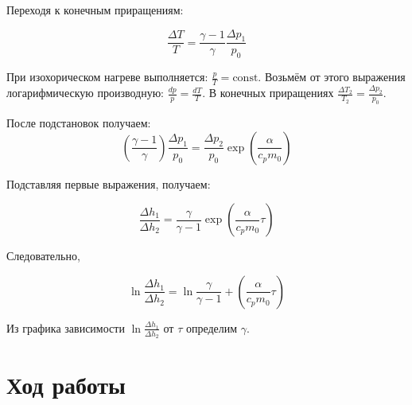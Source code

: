 \documentclass[a4paper,12pt]{article}
\begin{document}
Переходя к конечным приращениям:

\begin{equation}
    \frac{\Delta T}{T} = \frac{\gamma - 1}{\gamma} \frac{\Delta p_1}{p_0}
\end{equation}

При изохорическом нагреве выполняется: $\frac{p}{T} = \text{const}$. Возьмём от этого выражения логарифмическую производную: $\frac{dp}{p} = \frac{dT}{T}$. В конечных приращениях $\frac{\Delta T_2}{T_2} = \frac{\Delta p_2}{p_0}$.

После подстановок получаем:
\begin{equation}
    \left( \frac{\gamma - 1}{\gamma} \right) \frac{\Delta p_1}{p_0} = \frac{\Delta p_2}{p_0} \exp\left(\frac{\alpha}{c_p m_0}\right)
\end{equation}


Подставляя первые выражения, получаем:

\begin{equation}
    \frac{\Delta h_1}{\Delta h_2} = \frac{\gamma}{\gamma - 1} \exp \left( \frac{\alpha}{c_p m_0}  \tau\right) 
\end{equation}

Следовательно, 

\begin{equation}
    \ln{\frac{\Delta h_1}{\Delta h_2}} = \ln{\frac{\gamma}{\gamma - 1}} + \left( \frac{\alpha}{c_p m_0}  \tau\right) 
\end{equation}

Из графика зависимости $\ln{\frac{\Delta h_1}{\Delta h_2}}$ от $\tau$ определим $\gamma$.
 

\section{Ход работы}
\end{document}
